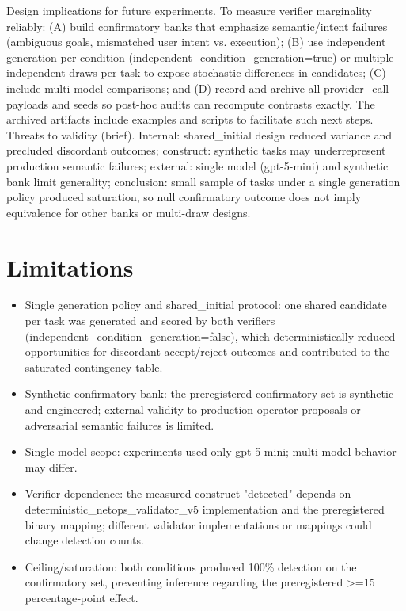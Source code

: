 \documentclass[conference]{IEEEtran}
\begin{document}
Design implications for future experiments. To measure verifier marginality reliably: (A) build confirmatory banks that emphasize semantic/intent failures (ambiguous goals, mismatched user intent vs. execution); (B) use independent generation per condition (independent\_condition\_generation=true) or multiple independent draws per task to expose stochastic differences in candidates; (C) include multi-model comparisons; and (D) record and archive all provider\_call payloads and seeds so post-hoc audits can recompute contrasts exactly. The archived artifacts include examples and scripts to facilitate such next steps.
Threats to validity (brief). Internal: shared\_initial design reduced variance and precluded discordant outcomes; construct: synthetic tasks may underrepresent production semantic failures; external: single model (gpt-5-mini) and synthetic bank limit generality; conclusion: small sample of tasks under a single generation policy produced saturation, so null confirmatory outcome does not imply equivalence for other banks or multi-draw designs.

\section{Limitations}
\begin{itemize}
\item Single generation policy and shared\_initial protocol: one shared candidate per task was generated and scored by both verifiers (independent\_condition\_generation=false), which deterministically reduced opportunities for discordant accept/reject outcomes and contributed to the saturated contingency table.
\item Synthetic confirmatory bank: the preregistered confirmatory set is synthetic and engineered; external validity to production operator proposals or adversarial semantic failures is limited.
\item Single model scope: experiments used only gpt-5-mini; multi-model behavior may differ.
\item Verifier dependence: the measured construct "detected" depends on deterministic\_netops\_validator\_v5 implementation and the preregistered binary mapping; different validator implementations or mappings could change detection counts.
\item Ceiling/saturation: both conditions produced 100\% detection on the confirmatory set, preventing inference regarding the preregistered >=15 percentage‑point effect.
\end{itemize}
\end{document}
